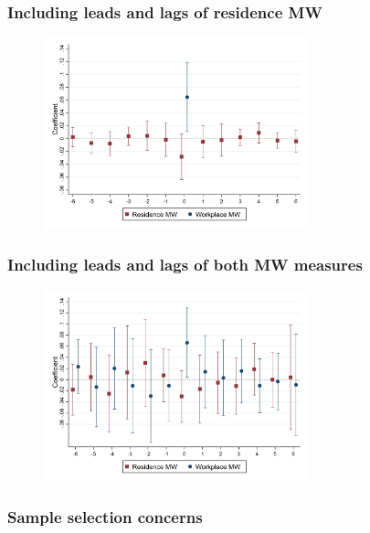 \documentclass[aspectratio=169, t]{beamer}
\begin{document}
\begin{frame}[label = res_only_dyn]
    \frametitle{Including leads and lags of residence MW}

    \begin{figure}
        \centering
        \includegraphics[width=0.68\textwidth]{fd_baseline/output/fd_both_mw_res_only_dynamic.png}
    \end{figure}
    
    \hyperlink{dyn_baseline_plot}{}
\end{frame}

\begin{frame}[label = both_dyn]
    \frametitle{Including leads and lags of both MW measures}

    \begin{figure}
        \centering
        \includegraphics[width=0.68\textwidth]{fd_baseline/output/fd_both_dynamic.png}
    \end{figure}
    
    \hyperlink{dyn_baseline_plot}{}
\end{frame}

\begin{frame}[label = robustness_sample]
    \frametitle{Sample selection concerns}

    
    
    \hyperlink{robustness}{}
\end{frame}
\end{document}
